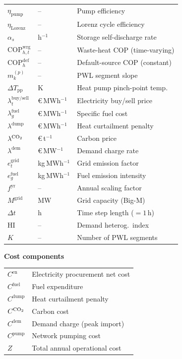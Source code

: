 \documentclass[a4paper,fleqn]{cas-dc}
\begin{document}
{\begin{tabular}{@{} >{\raggedright}p{1.5cm} >{\raggedright}p{1.8cm} p{3.2cm} @{}}
$\eta_{\mathrm{pump}}$       & --             & Pump efficiency \\
$\eta_{\mathrm{Lorenz}}$     & --             & Lorenz cycle efficiency \\
$\alpha_s$                   & h$^{-1}$       & Storage self-discharge rate \\
$\mathrm{COP}_{h,t}^{\mathrm{wrg}}$ & --     & Waste-heat COP (time-varying) \\
$\mathrm{COP}_h^{\mathrm{def}}$     & --     & Default-source COP (constant) \\
$m_k^{(p)}$                  & --             & PWL segment slope \\
$\Delta T_{\mathrm{pp}}$     & K              & Heat pump pinch-point temp. \\
$\lambda_t^{\mathrm{buy/sell}}$ & \euro\,MWh$^{-1}$ & Electricity buy/sell price \\
$\lambda_g^{\mathrm{fuel}}$  & \euro\,MWh$^{-1}$ & Specific fuel cost \\
$\lambda^{\mathrm{dump}}$    & \euro\,MWh$^{-1}$ & Heat curtailment penalty \\
$\lambda^{\ce{CO2}}$         & \euro\,t$^{-1}$ & Carbon price \\
$\lambda^{\mathrm{dem}}$     & \euro\,MW$^{-1}$ & Demand charge rate \\
$e_t^{\mathrm{grid}}$        & kg\,MWh$^{-1}$ & Grid emission factor \\
$e_g^{\mathrm{fuel}}$        & kg\,MWh$^{-1}$ & Fuel emission intensity \\
$f^{\mathrm{yr}}$            & --             & Annual scaling factor \\
$M^{\mathrm{grid}}$          & MW             & Grid capacity (Big-M) \\
$\Delta t$                   & h              & Time step length ($= 1$\,h) \\
HI                           & --             & Demand heterog.\ index \\
$K$                          & --             & Number of PWL segments \\
\end{tabular}

\smallskip\noindent\textbf{Cost components}\par\nopagebreak\smallskip
\noindent
\begin{tabular}{@{} >{\raggedright}p{1.5cm} p{5.0cm} @{}}
$C^{\mathrm{en}}$    & Electricity procurement net cost \\
$C^{\mathrm{fuel}}$  & Fuel expenditure \\
$C^{\mathrm{dump}}$  & Heat curtailment penalty \\
$C^{\ce{CO2}}$       & Carbon cost \\
$C^{\mathrm{dem}}$   & Demand charge (peak import) \\
$C^{\mathrm{pump}}$  & Network pumping cost \\
$Z$                  & Total annual operational cost \\
\end{tabular}

}
\end{document}
